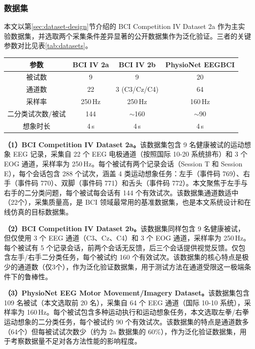 \subsubsection{数据集}

本文以第\ref{sec:dataset-design}节介绍的 BCI Competition IV Dataset 2a 作为主实验数据集，并选取两个采集条件差异显著的公开数据集作为泛化验证。三者的关键参数对比见表\ref{tab:datasets}。

\begin{table}[htbp]
	\centering
	\begin{tabular}{cccc}
		\toprule
		参数 & BCI IV 2a & BCI IV 2b & PhysioNet EEGBCI \\
		\midrule
		被试数 & 9 & 9 & 20 \\
		通道数 & 22 & 3 (C3/Cz/C4) & 64 \\
		采样率 & 250\,Hz & 250\,Hz & 160\,Hz \\
		二分类试次数/被试 & 144 & $\sim$160 & $\sim$90 \\
		想象时长 & 4\,s & 4\,s & 4\,s \\
		\bottomrule
	\end{tabular}
\end{table}

\textbf{（1）BCI Competition IV Dataset 2a。}该数据集包含 9 名健康被试的运动想象 EEG 记录，采集自 22 个 EEG 电极通道（按照国际 10-20 系统排布）和 3 个 EOG 通道，采样率为 250\,Hz。每个被试有两个记录会话（Session T 和 Session E），每个会话包含 288 个试次，涵盖 4 类运动想象任务：左手（事件码 769）、右手（事件码 770）、双脚（事件码 771）和舌头（事件码 772）。本文聚焦于左手与右手的二分类问题，每个被试每会话有 144 个有效试次。该数据集通道数适中（22个），采集质量高，是 BCI 领域最常用的基准数据集，也是本文系统设计和在线仿真的目标数据集。

\textbf{（2）BCI Competition IV Dataset 2b。}该数据集同样包含 9 名健康被试，但仅使用 3 个 EEG 通道（C3、Cz、C4）和 3 个 EOG 通道，采样率为 250\,Hz。每个被试有 5 个记录会话，前两个会话无反馈，后三个会话提供视觉反馈。仅包含左手/右手二分类任务，每个被试约 160 个有效试次。该数据集的核心特点是极少的通道数（仅3个），作为泛化验证数据集，用于测试方法在通道受限这一极端条件下的鲁棒性。

\textbf{（3）PhysioNet EEG Motor Movement/Imagery Dataset。}该数据集包含 109 名被试（本文选取前 20 名），采集自 64 个 EEG 通道（国际 10-10 系统），采样率为 160\,Hz。每个被试包含多种运动执行和运动想象任务，本文选取左拳/右拳运动想象的二分类任务，每个被试约 90 个有效试次。该数据集的特点是通道数多（64个）但每被试试次数少（约为 2a 数据集的 60\%），作为泛化验证数据集，用于考察数据量不足对各方法性能的影响程度。

